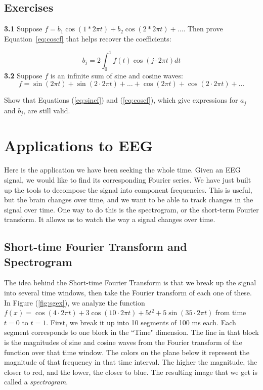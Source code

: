 \documentclass{article}
\begin{document}



\subsection*{Exercises}
{\bf 3.1} Suppose $f = b_1\cos(1 * 2\pi t)+b_2\cos(2 * 2\pi t)+\dots$.  Then prove Equation~\ref{eq:coscf} that helps recover the coefficients:

$$b_j = 2 \int_{0}^1f(t)\cos(j \cdot 2\pi t)dt$$
{\bf 3.2} Suppose $f$ is an infinite sum of sine and cosine waves:
\[f = \sin(2\pi t)+ \sin(2\cdot2\pi t) +\dots + \cos(2\pi t)+ \cos(2\cdot2\pi t) +\dots\]

Show that Equations (\ref{eq:sincf}) and (\ref{eq:coscf}), which give expressions for $a_j$ and $b_j$, are still valid.


\section{Applications to EEG}
Here is the application we have been seeking the whole time.  Given an EEG signal, we would like to find its corresponding Fourier series.  We have just built up the tools to decompose the signal into component frequencies.  This is useful, but the brain changes over time, and we want to be able to track changes in the signal over time.  One way to do this is the spectrogram, or the short-term Fourier transform.  It allows us to watch the way a signal changes over time.  

\subsection{Short-time Fourier Transform and Spectrogram}
The idea behind the Short-time Fourier Transform is that we break up the signal into several time windows, then take the Fourier transform of each one of these.  In Figure (\ref{fig:sgex}), we analyze the function $f(x) = \cos(4\cdot2\pi t) + 3\cos(10\cdot 2\pi t) + 5t^2 + 5\sin(35\cdot 2\pi t)$ from time $t=0$ to $t=1$.  First, we break it up into 10 segments of 100 ms each.  Each segment corresponds to one block in the ``Time" dimension.  The line in that block is the magnitudes of sine and cosine waves from the Fourier transform of the function over that time window.  The colors on the plane below it represent the magnitude of that frequency in that time interval.  The higher the magnitude, the closer to red, and the lower, the closer to blue.  The resulting image that we get is called a {\it spectrogram}.
\end{document}
